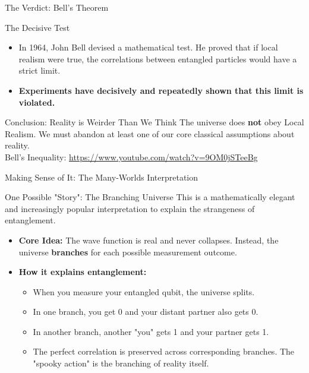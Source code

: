 \documentclass{beamer}
\begin{document}
\begin{frame}[fragile]{The Verdict: Bell's Theorem}
    \begin{block}{The Decisive Test}
        \begin{itemize}
            \item In 1964, John Bell devised a mathematical test. He proved that if local realism were true, the correlations between entangled particles would have a strict limit.
            \item \textbf{Experiments have decisively and repeatedly shown that this limit is violated.}
        \end{itemize}
    \end{block}
    
    \begin{exampleblock}{Conclusion: Reality is Weirder Than We Think}
        The universe does \textbf{not} obey Local Realism. We must abandon at least one of our core classical assumptions about reality.
        \\Bell's Inequality: \url{https://www.youtube.com/watch?v=9OM0jSTeeBg}
    \end{exampleblock}
\end{frame}

\begin{frame}[fragile]{Making Sense of It: The Many-Worlds Interpretation}
    \begin{block}{One Possible "Story": The Branching Universe}
        This is a mathematically elegant and increasingly popular interpretation to explain the strangeness of entanglement.
        \begin{itemize}
            \item \textbf{Core Idea:} The wave function is real and never collapses. Instead, the universe \textbf{branches} for each possible measurement outcome.
            \item \textbf{How it explains entanglement:}
            \begin{itemize}
                \item When you measure your entangled qubit, the universe splits. 
                \item In one branch, you get 0 and your distant partner also gets 0.
                \item In another branch, another "you" gets 1 and your partner gets 1.
                \item The perfect correlation is preserved across corresponding branches. The "spooky action" is the branching of reality itself.
            \end{itemize}
        \end{itemize}
    \end{block}
\end{frame}
\end{document}
